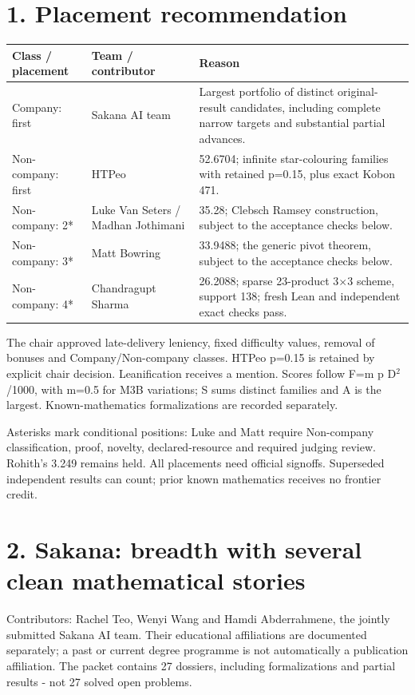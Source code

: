 \documentclass[10pt,a4paper]{article}
\begin{document}
\section{1. Placement recommendation}
\begingroup\footnotesize\begin{longtable}{p{29.87mm}p{44.8mm}p{74.67mm}}\toprule
Class / placement & Team / contributor & Reason \\ \midrule
Company: first & Sakana AI team & Largest portfolio of distinct original-result candidates, including complete narrow targets and substantial partial advances. \\ 
Non-company: first & HTPeo & 52.6704; infinite star-colouring families with retained p=0.15, plus exact Kobon 471. \\ 
Non-company: 2* & Luke Van Seters / Madhan Jothimani & 35.28; Clebsch Ramsey construction, subject to the acceptance checks below. \\ 
Non-company: 3* & Matt Bowring & 33.9488; the generic pivot theorem, subject to the acceptance checks below. \\ 
Non-company: 4* & Chandragupt Sharma & 26.2088; sparse 23-product 3\ensuremath{\times}3 scheme, support 138; fresh Lean and independent exact checks pass. \\ 
\bottomrule\end{longtable}\endgroup
The chair approved late-delivery leniency, fixed difficulty values, removal of bonuses and Company/Non-company classes. HTPeo p=0.15 is retained by explicit chair decision. Leanification receives a mention. Scores follow F=m p D\ensuremath{^2}/1000, with m=0.5 for M3B variations; S sums distinct families and A is the largest. Known-mathematics formalizations are recorded separately.

{\small Asterisks mark conditional positions: Luke and Matt require Non-company classification, proof, novelty, declared-resource and required judging review. Rohith's 3.249 remains held. All placements need official signoffs. Superseded independent results can count; prior known mathematics receives no frontier credit.\par}

\clearpage
\section{2. Sakana: breadth with several clean mathematical stories}
Contributors: Rachel Teo, Wenyi Wang and Hamdi Abderrahmene, the jointly submitted Sakana AI team. Their educational affiliations are documented separately; a past or current degree programme is not automatically a publication affiliation. The packet contains 27 dossiers, including formalizations and partial results - not 27 solved open problems.
\end{document}
